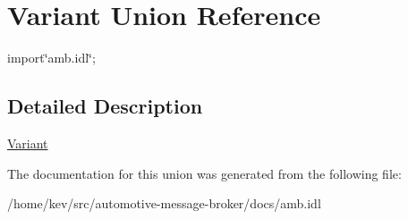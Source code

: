 \hypertarget{unionVariant}{\section{Variant Union Reference}
\label{unionVariant}
}


{\ttfamily import\char`\"{}amb.\-idl\char`\"{};}



\subsection{Detailed Description}
\hyperlink{unionVariant}{Variant} 

The documentation for this union was generated from the following file\-:\begin{DoxyCompactItemize}
\item 
/home/kev/src/automotive-\/message-\/broker/docs/amb.\-idl\end{DoxyCompactItemize}
